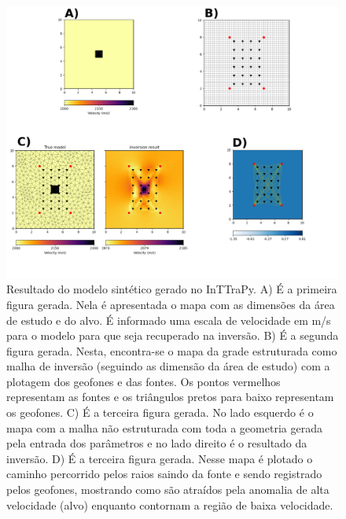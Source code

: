 \documentclass[a4paper, 12 pt]{article} %
\begin{document}
\begin{description}
\begin{table}[!hbtp]
\begin{tabular}{@{}lc@{}}
			\\ \bottomrule
		\end{tabular}
	\end{table}
	
	\begin{figure}[!hbtp]
		\begin{center}
			\includegraphics[scale=0.408]{Figuras/exemplo.png}
		\end{center}
		\caption{Resultado do modelo sintético gerado no InTTraPy. A) É a primeira figura gerada. Nela é apresentada o mapa com as dimensões da área de estudo e do alvo. É informado uma escala de velocidade em m/s para o modelo para que seja recuperado na inversão. B) É a segunda figura gerada. Nesta, encontra-se o mapa da grade estruturada como malha de inversão (seguindo as dimensão da área de estudo) com a plotagem dos geofones e das fontes. Os pontos vermelhos representam as fontes e os triângulos pretos para baixo representam os geofones. C) É a terceira figura gerada. No lado esquerdo é o mapa com a malha não estruturada com toda a geometria gerada pela entrada dos parâmetros e no lado direito é o resultado da inversão. D) É a terceira figura gerada. Nesse mapa é plotado o caminho percorrido pelos raios saindo da fonte e sendo registrado pelos geofones, mostrando como são atraídos pela anomalia de alta velocidade (alvo) enquanto contornam a região de baixa velocidade.}
		\label{dado_sintetico}
	\end{figure} \newpage
	
\end{description}
\end{document}
